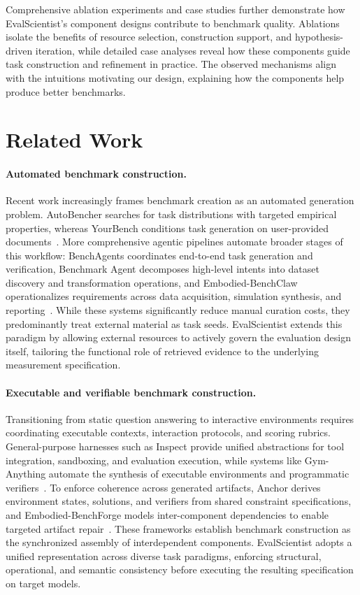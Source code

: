 \documentclass{article} %
\begin{document}
	Comprehensive ablation experiments and case studies further demonstrate how
	EvalScientist's component designs contribute to benchmark quality.
	Ablations isolate the benefits of resource selection, construction support,
	and hypothesis-driven iteration, while detailed case analyses reveal how
	these components guide task construction and refinement in practice.
	The observed mechanisms align with the intuitions motivating our design,
	explaining how the components help produce better benchmarks.
	
	\section{Related Work}\label{sec:related-work}
	
	\paragraph{Automated benchmark construction.}
Recent work increasingly frames benchmark creation as an automated generation problem. AutoBencher searches for task distributions with targeted empirical properties, whereas YourBench conditions task generation on user-provided documents~\citep{li2025autobencher,shashidhar2025yourbench}. More comprehensive agentic pipelines automate broader stages of this workflow: BenchAgents coordinates end-to-end task generation and verification, Benchmark Agent decomposes high-level intents into dataset discovery and transformation operations, and Embodied-BenchClaw operationalizes requirements across data acquisition, simulation synthesis, and reporting~\citep{benchagents2025,xiong2026benchmarkagent,embodiedbenchclaw2026}. While these systems significantly reduce manual curation costs, they predominantly treat external material as task seeds. EvalScientist extends this paradigm by allowing external resources to actively govern the evaluation design itself, tailoring the functional role of retrieved evidence to the underlying measurement specification.

\paragraph{Executable and verifiable benchmark construction.}
Transitioning from static question answering to interactive environments requires coordinating executable contexts, interaction protocols, and scoring rubrics. General-purpose harnesses such as Inspect provide unified abstractions for tool integration, sandboxing, and evaluation execution, while systems like Gym-Anything automate the synthesis of executable environments and programmatic verifiers~\citep{inspect2024,aggarwal2026gymanything}. To enforce coherence across generated artifacts, Anchor derives environment states, solutions, and verifiers from shared constraint specifications, and Embodied-BenchForge models inter-component dependencies to enable targeted artifact repair~\citep{anchor2026,benchforge2026}. These frameworks establish benchmark construction as the synchronized assembly of interdependent components. EvalScientist adopts a unified representation across diverse task paradigms, enforcing structural, operational, and semantic consistency before executing the resulting specification on target models.
\end{document}
